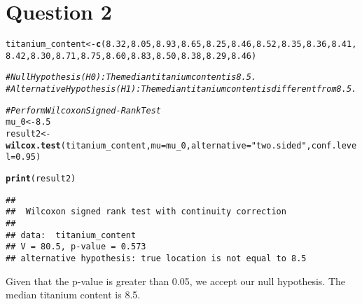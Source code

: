 \documentclass{article}\usepackage[]{graphicx}\usepackage[]{xcolor}
\makeatletter
\newcommand{\hlnum}[1]{\textcolor[rgb]{0.686,0.059,0.569}{#1}}%
\newcommand{\hlsng}[1]{\textcolor[rgb]{0.192,0.494,0.8}{#1}}%
\newcommand{\hlcom}[1]{\textcolor[rgb]{0.678,0.584,0.686}{\textit{#1}}}%
\newcommand{\hldef}[1]{\textcolor[rgb]{0.345,0.345,0.345}{#1}}%
\newcommand{\hlkwb}[1]{\textcolor[rgb]{0.69,0.353,0.396}{#1}}%
\newcommand{\hlkwc}[1]{\textcolor[rgb]{0.333,0.667,0.333}{#1}}%
\newcommand{\hlkwd}[1]{\textcolor[rgb]{0.737,0.353,0.396}{\textbf{#1}}}%
\newenvironment{kframe}{%
 \def\at@end@of@kframe{}%
 \ifinner\ifhmode%
  \def\at@end@of@kframe{\end{minipage}}%
  \begin{minipage}{\columnwidth}%
 \fi\fi%
 \def\FrameCommand##1{\hskip\@totalleftmargin \hskip-\fboxsep
 \colorbox{shadecolor}{##1}\hskip-\fboxsep
     \hskip-\linewidth \hskip-\@totalleftmargin \hskip\columnwidth}%
 \MakeFramed {\advance\hsize-\width
   \@totalleftmargin\z@ \linewidth\hsize
   \@setminipage}}%
 {\par\unskip\endMakeFramed%
 \at@end@of@kframe}
\newenvironment{knitrout}{}{} %
\makeatother
\begin{document}
\section{Question 2}
\begin{knitrout}
\color{fgcolor}\begin{kframe}
\begin{alltt}
\hldef{titanium_content} \hlkwb{<-} \hlkwd{c}\hldef{(}\hlnum{8.32}\hldef{,} \hlnum{8.05}\hldef{,} \hlnum{8.93}\hldef{,} \hlnum{8.65}\hldef{,} \hlnum{8.25}\hldef{,} \hlnum{8.46}\hldef{,} \hlnum{8.52}\hldef{,} \hlnum{8.35}\hldef{,} \hlnum{8.36}\hldef{,} \hlnum{8.41}\hldef{,}
                      \hlnum{8.42}\hldef{,} \hlnum{8.30}\hldef{,} \hlnum{8.71}\hldef{,} \hlnum{8.75}\hldef{,} \hlnum{8.60}\hldef{,} \hlnum{8.83}\hldef{,} \hlnum{8.50}\hldef{,} \hlnum{8.38}\hldef{,} \hlnum{8.29}\hldef{,} \hlnum{8.46}\hldef{)}

\hlcom{# Null Hypothesis (H0): The median titanium content is 8.5.}
\hlcom{# Alternative Hypothesis (H1): The median titanium content is different from 8.5.}

\hlcom{# Perform Wilcoxon Signed-Rank Test}
\hldef{mu_0} \hlkwb{<-} \hlnum{8.5}
\hldef{result2} \hlkwb{<-} \hlkwd{wilcox.test}\hldef{(titanium_content,} \hlkwc{mu} \hldef{= mu_0,} \hlkwc{alternative} \hldef{=} \hlsng{"two.sided"}\hldef{,} \hlkwc{conf.level} \hldef{=} \hlnum{0.95}\hldef{)}
\end{alltt}


{\ttfamily\noindent{}}

{\ttfamily\noindent{}}\begin{alltt}
\hlkwd{print}\hldef{(result2)}
\end{alltt}
\begin{verbatim}
## 
## 	Wilcoxon signed rank test with continuity correction
## 
## data:  titanium_content
## V = 80.5, p-value = 0.573
## alternative hypothesis: true location is not equal to 8.5
\end{verbatim}
\end{kframe}
\end{knitrout}
Given that the p-value is greater than 0.05, we accept our null hypothesis. The median titanium content is 8.5.
\end{document}
